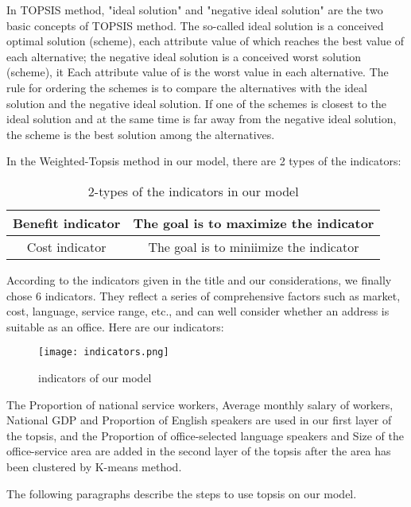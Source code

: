 \documentclass[12pt]{article}  %
\begin{document}
In TOPSIS method, "ideal solution" and "negative ideal solution" are the two basic concepts of TOPSIS method. The so-called ideal solution is a conceived optimal solution (scheme), each attribute value of which reaches the best value of each alternative; the negative ideal solution is a conceived worst solution (scheme), it Each attribute value of is the worst value in each alternative. The rule for ordering the schemes is to compare the alternatives with the ideal solution and the negative ideal solution. If one of the schemes is closest to the ideal solution and at the same time is far away from the negative ideal solution, the scheme is the best solution among the alternatives.

In the Weighted-Topsis method in our model, there are 2 types of the indicators:

\begin{table}[H]
	\begin{center}
		\caption{2-types of the indicators in our model}
		\begin{tabular}{|c|c|}
			\hline
			Benefit indicator & The goal is to maximize the indicator  \\ \hline
			Cost indicator    & The goal is to miniimize the indicator \\ \hline
		\end{tabular}
	\end{center}
\end{table}

According to the indicators given in the title and our considerations, we finally chose 6 indicators. They reflect a series of comprehensive factors such as market, cost, language, service range, etc., and can well consider whether an address is suitable as an office. Here are our indicators:

\begin{figure}[H]
	\centering
	\texttt{[image: indicators.png]}
	\caption{indicators of our model}\label{fig:indicators}
\end{figure}

The Proportion of national service workers, Average monthly salary of workers, National GDP and Proportion of English speakers are used in our first layer of the topsis, and the Proportion of office-selected language speakers and Size of the office-service area are added in the second layer of the topsis after the area has been clustered by K-means method.

The following paragraphs describe the steps to use topsis on our model.
\end{document}
